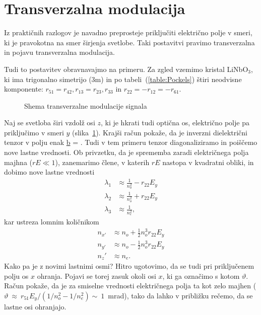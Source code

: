 \section{Transverzalna modulacija}
Iz praktičnih razlogov je navadno preprosteje priključiti električno polje v smeri, ki 
je pravokotna na smer širjenja svetlobe. Taki postavitvi pravimo transverzalna in pojavu
transverzalna modulacija.

Tudi to postavitev obravnavajmo na primeru. Za zgled vzemimo kristal LiNbO$_3$, ki 
ima trigonalno simetrijo (3m) in po tabeli~(\ref{table:Pockels}) štiri 
neodvisne komponente: $r_{51}=r_{42}, r_{13}=r_{23}, r_{33}$ in $r_{22}=-r_{12}=-r_{61}$.

\begin{figure}[h]
\centering
\def\svgwidth{80truemm} 

\caption{Shema transverzalne modulacije signala}
\label{fig:tmshema}
\end{figure}
\pagebreak
Naj se svetloba širi vzdolž osi $z$, ki je hkrati tudi optična os, 
električno polje pa priključimo v smeri $y$ (slika~\ref{fig:tmshema}). 
Krajši račun pokaže, da je inverzni dielektrični tenzor v polju enak
\beq
\underline{b} = 
 .
\label{7.8b}
\eeq
Tudi v tem primeru tenzor diagonaliziramo in poiščemo nove lastne vrednosti.
Ob privzetku, da je sprememba zaradi električnega polja majhna ($rE\ll1$),
zanemarimo člene, v katerih $rE$ nastopa v kvadratni obliki, in dobimo nove lastne vrednosti 
\begin{align}
\lambda_1 &\approx \frac{1}{n_o^2}-r_{22}E_y \\
\lambda_2 &\approx \frac{1}{n_o^2}+ r_{22}E_y \\
\lambda_3 &\approx \frac{1}{n_e^2},
\end{align}
kar ustreza lomnim količnikom 
\begin{align}
n_{x'} &\approx n_o+\frac{1}{2}n_o^3r_{22}E_y\\
n_{y'} &\approx n_o-\frac{1}{2}n_o^3r_{22}E_y\\
n_z' &\approx n_e.
\end{align}
Kako pa je z novimi lastnimi osmi? Hitro ugotovimo, da se tudi pri 
priključenem polju os $x$ ohranja. Pojavi se torej zasuk okoli osi $x$,
ki ga označimo s kotom $\vartheta$. Račun pokaže, da je za smiselne
vrednosti električnega polja ta kot zelo majhen ($\vartheta~
\approx~r_{51}E_y/(1/n_o^2-1/n_e^2) \sim~1$~mrad),
tako da lahko v približku rečemo, da se lastne osi ohranjajo. 

